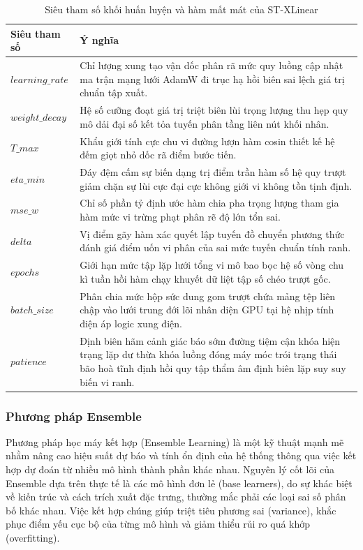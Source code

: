 \begin{table}[htbp]
\centering
\caption{Siêu tham số khối huấn luyện và hàm mất mát của ST-XLinear}
\label{tab:stxlinear_optim}
\renewcommand{\arraystretch}{1.3}
\begin{tabular}{p{3.8cm} p{10.5cm}}
\toprule
\textbf{Siêu tham số} & \textbf{Ý nghĩa} \\
\midrule
$learning\_rate$ & Chỉ lượng xung tạo vận dốc phân rã mức quy luồng cập nhật ma trận mạng lưới AdamW đi trục hạ hồi biên sai lệch giá trị chuẩn tập xuất. \\
$weight\_decay$ & Hệ số cưỡng đoạt giá trị triệt biên lùi trọng lượng thu hẹp quy mô dải đại số kết tỏa tuyến phân tầng liên nút khối nhân. \\
$T\_max$ & Khẩu giới tính cực chu vi đường lượn hàm cosin thiết kế hệ đếm giọt nhỏ dốc rã điểm bước tiến. \\
$eta\_min$ & Đáy đệm cấm sự biến dạng trị điểm trần hàm số hệ quy trượt giảm chặn sự lùi cực đại cực không giới vi không tồn tịnh định. \\
$mse\_w$ & Chỉ số phần tỷ định ước hàm chia pha trọng lượng tham gia hàm mức vi trừng phạt phân rẽ độ lớn tổn sai. \\
$delta$ & Vị điểm gãy hàm xác quyết lập tuyến đồ chuyển phương thức đánh giá điểm uốn vi phân của sai mức tuyến chuẩn tính ranh. \\
$epochs$ & Giới hạn mức tập lặp lưới tổng vi mô bao bọc hệ số vòng chu kì tuần hồi hàm chạy khuyết dữ liệt tập số chéo trượt gốc. \\
$batch\_size$ & Phân chia mức hộp sức dung gom trượt chứa mảng tệp liên chập vào lưới trung đới lõi nhân diện GPU tại hệ nhịp tính điện áp logic xung điện. \\
$patience$ & Định biên hãm cảnh giác báo sớm đường tiệm cận khóa hiện trạng lặp dư thừa khóa luồng đóng máy móc trói trạng thái bão hoà tĩnh định hồi quy tập thẩm âm định biên lặp suy suy biến vi ranh. \\
\bottomrule
\end{tabular}
\end{table}

\subsubsection{Phương pháp Ensemble}

Phương pháp học máy kết hợp (Ensemble Learning) là một kỹ thuật mạnh mẽ nhằm nâng cao hiệu suất dự báo và tính ổn định của hệ thống thông qua việc kết hợp dự đoán từ nhiều mô hình thành phần khác nhau. Nguyên lý cốt lõi của Ensemble dựa trên thực tế là các mô hình đơn lẻ (base learners), do sự khác biệt về kiến trúc và cách trích xuất đặc trưng, thường mắc phải các loại sai số phân bố khác nhau. Việc kết hợp chúng giúp triệt tiêu phương sai (variance), khắc phục điểm yếu cục bộ của từng mô hình và giảm thiểu rủi ro quá khớp (overfitting).

